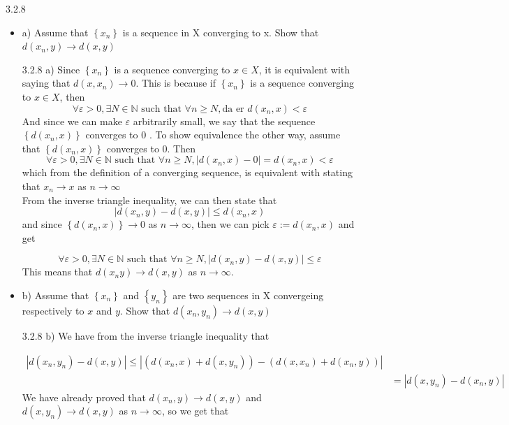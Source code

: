 \documentclass[a4paper,norsk]{article}
\renewcommand{\geq}{\geqslant}
\renewcommand{\leq}{\leqslant}
\renewcommand{\epsilon}{\varepsilon}
\begin{document}
\begin{oppgavebox}{3.2.8}{}
\begin{itemize}
  \item a) Assume that $ \left\{ x_n \right\}  $ is a sequence in X converging to x. Show that $ d(x_n, y) \rightarrow d(x, y) $
  \begin{proofbox}{3.2.8 a)}{}
    Since $ \left\{ x_n \right\}  $ is a sequence converging to $ x \in X $, it is equivalent with saying that $ d(x, x_n) \rightarrow 0 $. This is because if $ \left\{ x_n \right\}  $ is a sequence converging to $ x \in X $, then 
    \[
        \forall \epsilon > 0, \exists N \in \mathbb{N} \text{ such that } \forall n \geq N, \text{da er } d(x_n, x) < \epsilon 
    \]
    And since we can make $ \epsilon  $ arbitrarily small, we say that the sequence $ \left\{ d \left( x_n, x \right)  \right\}  $ converges to $ 0 $ . To show equivalence the other way, assume that $ \left\{ d \left( x_n, x \right)  \right\}  $ converges to $ 0 $. Then 
    \[
        \forall \epsilon > 0, \exists N \in \mathbb{N} \text{ such that } \forall n \geq N, \left| d(x_n, x) - 0 \right| = d(x_n, x) < \epsilon  
    \]
    which from the definition of a converging sequence, is equivalent with stating that $ x_n \rightarrow x $ as $ n \rightarrow \infty $\\

    From the inverse triangle inequality, we can then state that
    \[
        \left| d(x_n, y) - d(x, y) \right| \leq d(x_n, x) 
    \]
    and since $ \left\{ d \left( x_n, x \right)  \right\} \rightarrow 0  $ as $ n \rightarrow \infty $, then we can pick $ \epsilon  := d \left( x_n, x \right) $ and get
    
    \[
        \forall \epsilon > 0, \exists N \in \mathbb{N} \text{ such that } \forall n \geq N, \left| d(x_n, y) - d(x, y) \right| \leq \epsilon  
    \]
    This means that $ d \left( x_n y \right) \rightarrow d(x, y)   $ as $ n \rightarrow \infty $. 
    
    


     
  \end{proofbox}
  \item b) Assume that $ \left\{ x_n \right\}  $ and $ \left\{ y_n \right\}  $ are two sequences in X convergeing respectively to $ x $ and $ y $. Show that $ d(x_n, y_n) \rightarrow d(x, y) $ 
  \begin{proofbox}{3.2.8 b)}{}
    We have from the inverse triangle inequality that

    \begin{align*}
      \left| d(x_n, y_n) - d(x, y) \right| \leq \left| \left( d(x_n, x) + d(x, y_n)\right) - \left( d(x, x_n) + d(x_n, y) \right)   \right|  \\
      &= \left| d(x, y_n) - d(x_n, y) \right| 
    \end{align*}
    We have already proved that $ d(x_n, y) \rightarrow d(x, y) $ and $ d(x, y_n) \rightarrow d(x, y) $ as $ n \rightarrow \infty $, so we get that 


\end{proofbox}
\end{itemize}
\end{oppgavebox}
\end{document}
